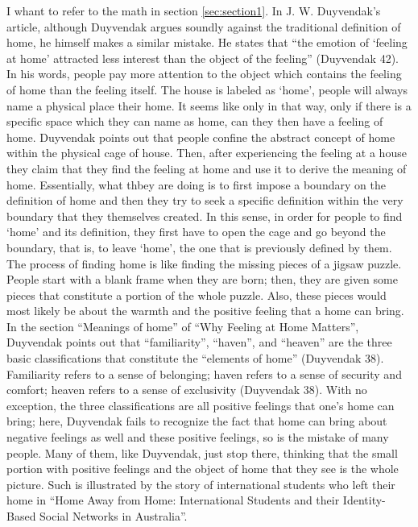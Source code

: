 \documentclass{article}
\begin{document}
\begin{spacing}{2.0}
I whant to refer to the math in section \ref{sec:section1}.
In J. W. Duyvendak’s article, although Duyvendak argues soundly against the traditional definition of home, he himself makes a similar mistake. He states that “the emotion of ‘feeling at home’ attracted less interest than the object of the feeling” (Duyvendak 42). In his words, people pay more attention to the object which contains the feeling of home than the feeling itself. The house is labeled as ‘home’, people will always name a physical place their home. It seems like only in that way, only if there is a specific space which they can name as home, can they then have a feeling of home. Duyvendak points out that people confine the abstract concept of home within the physical cage of house. Then, after experiencing the feeling at a house they claim that they find the feeling at home and use it to derive the meaning of home. Essentially, what thbey are doing is to first impose a boundary on the definition of home and then they try to seek a specific definition within the very boundary that they themselves created. In this sense, in order for people to find ‘home’ and its definition, they first have to open the cage and go beyond the boundary, that is, to leave ‘home’, the one that is previously defined by them. The process of finding home is like finding the missing pieces of a jigsaw puzzle. People start with a blank frame when they are born; then, they are given some pieces that constitute a portion of the whole puzzle. Also, these pieces would most likely be about the warmth and the positive feeling that a home can bring. In the section “Meanings of home” of “Why Feeling at Home Matters”, Duyvendak points out that “familiarity”, “haven”, and “heaven” are the three basic classifications that constitute the “elements of home” (Duyvendak 38). Familiarity refers to a sense of belonging; haven refers to a sense of security and comfort; heaven refers to a sense of exclusivity (Duyvendak 38). With no exception, the three classifications are all positive feelings that one’s home can bring; here, Duyvendak fails to recognize the fact that home can bring about negative feelings as well and these positive feelings, so is the mistake of many people. Many of them, like Duyvendak, just stop there, thinking that the small portion with positive feelings and the object of home that they see is the whole picture. Such is illustrated by the story of international students who left their home in “Home Away from Home: International Students and their Identity-Based Social Networks in Australia”.
\end{spacing}
\end{document}

